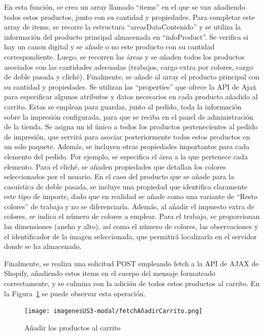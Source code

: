 \documentclass[11pt]{article}
\begin{document}
En esta función, se crea un array llamado ``items'' en el que se van añadiendo todos estos productos, junto con su cantidad 
y propiedades. Para completar este array de items, se recorre la estructura ``areasDataContenido'' y se utiliza la información del producto principal 
almacenada en ``infoProduct''. Se verifica si hay un canon digital y se añade o no este producto con su cantidad correspondiente. Luego, se recorren las
áreas y se añaden todos los productos asociados con las cantidades adecuadas (trabajos, cargo extra por colores, cargo de doble pasada y cliché). 
Finalmente, se añade al array el producto principal con su cantidad y propiedades. Se utilizan las ``properties'' que ofrece la API de Ajax para especificar 
algunos atributos y datos necesarios en cada producto añadido al carrito. Estas se emplean para guardar, junto al pedido, toda la información sobre la impresión 
configurada, para que se reciba en el panel de administración de la tienda. Se asigna un id único a todos los productos pertenecientes 
al pedido de impresión, que servirá para asociar posteriormente todos estos productos en un solo paquete. Además, se incluyen otras propiedades importantes
para cada elemento del pedido. Por ejemplo, se especifica el área a la que pertenece cada elemento. Para el cliché, se añaden 
propiedades que detallan los colores seleccionados por el usuario. En el caso del producto que se añade para la casuística de doble pasada, se incluye una
propiedad que identifica claramente este tipo de importe, dado que en realidad se añade como una variante de ``Resto colores'' de trabajo y no se diferenciaría. Además, 
al añadir el impuesto extra de colores, se indica el número de colores a emplear. Para el trabajo, se proporcionan las dimensiones (ancho y alto), 
así como el número de colores, las observaciones y el identificador de la imagen seleccionada, que permitirá localizarla en el servidor donde se ha almacenado.

Finalmente, se realiza una solicitud POST empleando fetch a la API de AJAX de Shopify, añadiendo estos items en el cuerpo 
del mensaje formateado correctamente, y se culmina con la adición de todos estos productos al carrito. En la Figura~\ref{fig:addCarritoFuncion} se puede
observar esta operación.

\begin{figure}[H]
    \centering
    \texttt{[image: imagenesUS3-modal/fetchAñadirCarrito.png]}
    \caption{\label{fig:addCarritoFuncion} Añadir los productos al carrito}
    \vspace{\fill}
\end{figure}
\end{document}
